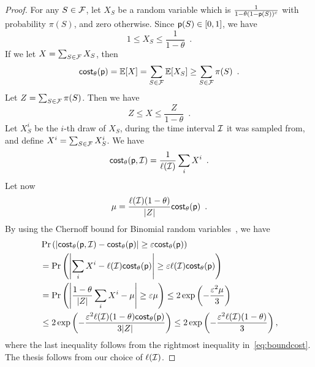 \begin{proof}
	For any $S\in\mathcal{F}$, let $X_S$ be a random variable which is
	$\frac{1}{1-\theta(1-\mathsf{p}(S))^c}$ with probability $\pi(S)$, and zero
	otherwise. Since $\mathsf{p}(S)\in [0,1]$, we have
	\[
		1\leq X_S \leq \frac{1}{1-\theta}\enspace.
	\]
	If we let $X = \sum_{S\in \mathcal{F}} X_S$, then
	\begin{equation}\label{eq:boundcost}
		\mathsf{cost}_\theta(\mathsf{p}) = \mathbb{E}[X] = \sum_{S\in\mathcal{F}} \mathbb{E}[X_{S}]
		\geq \sum_{S\in\mathcal{F}}\pi(S)\enspace.
	\end{equation}
	Let $Z=\sum_{S\in\mathcal{F}}\pi(S)$. Then we have
	\[
		Z \leq X \leq \frac{Z}{1-\theta}\enspace.
	\]
	Let $X^i_S$ be the $i$-th draw of $X_S$, during the time interval $\mathcal{I}$ it
	was sampled from, and define $X^i = \sum_{S\in\mathcal{F}}X_S^i$. We have
	\[
		\mathsf{cost}_\theta(\mathsf{p},\mathcal{I}) =
		\frac{1}{\ell(\mathcal{I})}\sum_{i}X^i\enspace.
	\]
	Let now
	\[
		\mu=\frac{\ell(\mathcal{I})(1-\theta)}{|Z|}\mathsf{cost}_\theta(\mathsf{p})\enspace.
	\]
	By using the Chernoff bound for Binomial random
	variables~\citep[Corol.~4.6]{MitzenmacherU05}, we have
	\begin{align*}
		&\Pr\left(\left|\mathsf{cost}_\theta(\mathsf{p},\mathcal{I}) - \mathsf{cost}_\theta(\mathsf{p})\right| \geq \varepsilon
		\mathsf{cost}_\theta(\mathsf{p})\right)\\
		&=\Pr\left(\left|\sum_i X^i - \ell(\mathcal{I})\mathsf{cost}_\theta(\mathsf{p})\right| \geq \varepsilon
		\ell(\mathcal{I}) \mathsf{cost}_\theta(\mathsf{p})\right) \\
		&= \Pr\left(\left|\frac{1-\theta}{|Z|}\sum_i X^i - \mu\right| \geq \varepsilon
		\mu\right) \leq 2\exp\left(-\frac{\varepsilon^2\mu}{3}\right)\\
		&\le 2\exp\left(-\frac{\varepsilon^2 \ell(\mathcal{I}) (1-\theta)
			\mathsf{cost}_\theta(\mathsf{p})}{3|Z|}\right) \leq 2\exp\left(-\frac{\varepsilon^2 \ell(\mathcal{I}) (1-\theta)}{3}\right),
	\end{align*}
	where the last inequality follows from the rightmost inequality
	in~\eqref{eq:boundcost}. The thesis follows from our choice of
	$\ell(\mathcal{I})$.
\end{proof}

